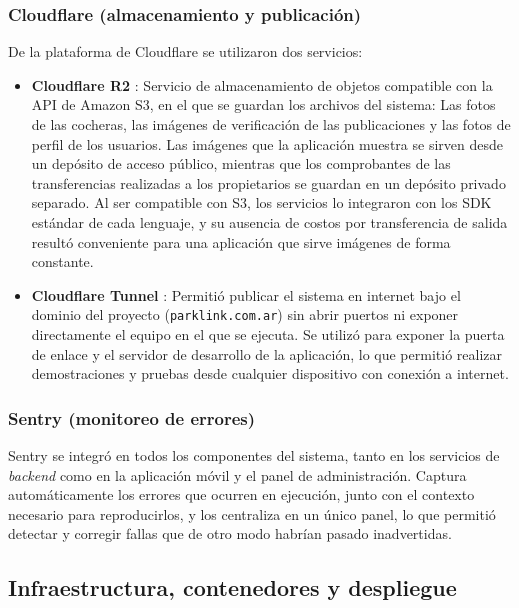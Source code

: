 \subsubsection{Cloudflare (almacenamiento y publicación)}

De la plataforma de Cloudflare se utilizaron dos servicios:

\begin{itemize}
    \item \textbf{Cloudflare R2} \autocite{cloudflarer2}: Servicio de almacenamiento de objetos compatible con la API de Amazon S3, en el que se guardan los archivos del sistema: Las fotos de las cocheras, las imágenes de verificación de las publicaciones y las fotos de perfil de los usuarios. Las imágenes que la aplicación muestra se sirven desde un depósito de acceso público, mientras que los comprobantes de las transferencias realizadas a los propietarios se guardan en un depósito privado separado. Al ser compatible con S3, los servicios lo integraron con los SDK estándar de cada lenguaje, y su ausencia de costos por transferencia de salida resultó conveniente para una aplicación que sirve imágenes de forma constante.
    \item \textbf{Cloudflare Tunnel} \autocite{cloudflaretunnel}: Permitió publicar el sistema en internet bajo el dominio del proyecto (\texttt{parklink.com.ar}) sin abrir puertos ni exponer directamente el equipo en el que se ejecuta. Se utilizó para exponer la puerta de enlace y el servidor de desarrollo de la aplicación, lo que permitió realizar demostraciones y pruebas desde cualquier dispositivo con conexión a internet.
\end{itemize}

\subsubsection{Sentry (monitoreo de errores)}

Sentry \autocite{sentry} se integró en todos los componentes del sistema, tanto en los servicios de \textit{backend} como en la aplicación móvil y el panel de administración. Captura automáticamente los errores que ocurren en ejecución, junto con el contexto necesario para reproducirlos, y los centraliza en un único panel, lo que permitió detectar y corregir fallas que de otro modo habrían pasado inadvertidas.

\subsection{Infraestructura, contenedores y despliegue}

